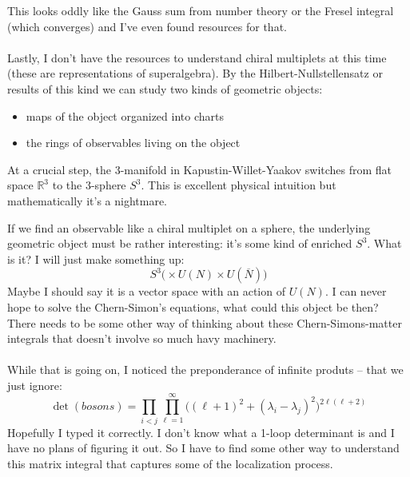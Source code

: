 \documentclass[12pt]{article}
\begin{document}
This looks oddly like the Gauss sum from number theory or the Fresel integral (which converges) and I've even found resources for that.  \\ \\
Lastly, I don't have the resources to understand chiral multiplets at this time (these are representations of superalgebra).  By the Hilbert-Nullstellensatz or results of this kind we can study two kinds of geometric objects:
\begin{itemize}
\item maps of the object organized into charts
\item the rings of observables living on the object
\end{itemize}
At a crucial step, the 3-manifold in Kapustin-Willet-Yaakov switches from flat space $\mathbb{R}^3$ to the 3-sphere $S^3$.  This is excellent physical intuition but mathematically it's a nightmare.

\newpage

\noindent If we find an observable like a chiral multiplet on a sphere, the underlying geometric object must be rather interesting: it's some kind of enriched $S^3$.  What is it?  I will just make something up:
$$ S^3  \Big( \times U(N) \times U(\overline{N}) \Big) $$
Maybe I should say it is a vector space with an action of $U(N)$.  I can never hope to solve the Chern-Simon's equations, what could this object be then?
There needs to be some other way of thinking about these Chern-Simons-matter integrals that doesn't involve so much havy machinery. \\ \\
While that is going on, I noticed the preponderance of infinite produts -- that we just ignore:
$$ \det (bosons) = \prod_{i < j} \prod_{\ell = 1}^\infty \Big( (\ell+1)^2 + (\lambda_i - \lambda_j)^2 \Big)^{2 \ell (\ell + 2)}  $$
Hopefully I typed it correctly. I don't know what a 1-loop determinant is and I have no plans of figuring it out. So I have to find some other way to understand this matrix integral that captures some of the localization process.

\vfill
\end{document}
